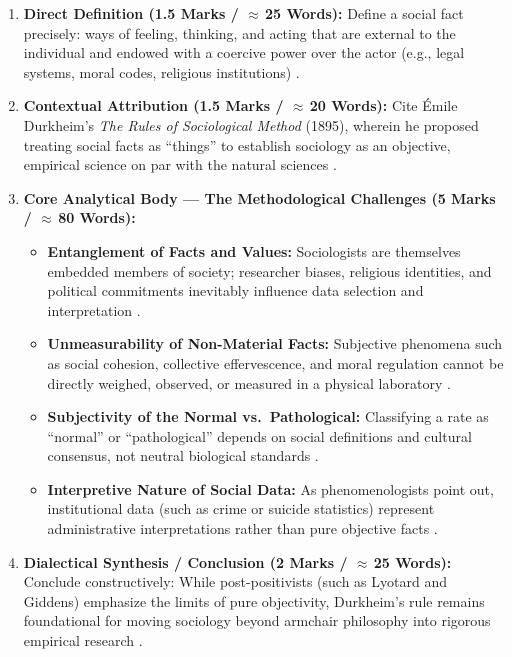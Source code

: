 \begin{enumerate}
    \item \textbf{Direct Definition (1.5 Marks / $\approx$\,25 Words):}
    Define a social fact precisely: ways of feeling, thinking, and acting that are external to the individual and endowed with a coercive power over the actor (e.g., legal systems, moral codes, religious institutions) .
    
    \item \textbf{Contextual Attribution (1.5 Marks / $\approx$\,20 Words):}
    Cite Émile Durkheim's \textit{The Rules of Sociological Method} (1895), wherein he proposed treating social facts as ``things'' to establish sociology as an objective, empirical science on par with the natural sciences .
    
    \item \textbf{Core Analytical Body --- The Methodological Challenges (5 Marks / $\approx$\,80 Words):}
    \begin{itemize}
        \item \textbf{Entanglement of Facts and Values:} Sociologists are themselves embedded members of society; researcher biases, religious identities, and political commitments inevitably influence data selection and interpretation .
        \item \textbf{Unmeasurability of Non-Material Facts:} Subjective phenomena such as social cohesion, collective effervescence, and moral regulation cannot be directly weighed, observed, or measured in a physical laboratory .
        \item \textbf{Subjectivity of the Normal vs.\ Pathological:} Classifying a rate as ``normal'' or ``pathological'' depends on social definitions and cultural consensus, not neutral biological standards .
        \item \textbf{Interpretive Nature of Social Data:} As phenomenologists point out, institutional data (such as crime or suicide statistics) represent administrative interpretations rather than pure objective facts .
    \end{itemize}
    
    \item \textbf{Dialectical Synthesis / Conclusion (2 Marks / $\approx$\,25 Words):}
    Conclude constructively: While post-positivists (such as Lyotard and Giddens) emphasize the limits of pure objectivity, Durkheim's rule remains foundational for moving sociology beyond armchair philosophy into rigorous empirical research .
\end{enumerate}

